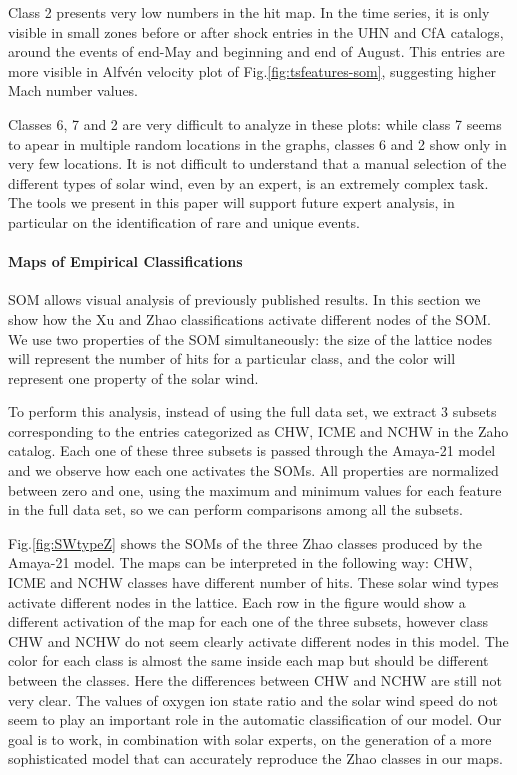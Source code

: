 Class 2 presents very low numbers in the hit map. In the time series, it is only visible in small zones before or after shock entries in the UHN and CfA catalogs, around the events of end-May and beginning and end of August. This entries are more visible in Alfv\'en velocity plot of Fig.\ref{fig:tsfeatures-som}, suggesting higher Mach number values.

Classes 6, 7 and 2 are very difficult to analyze in these plots: while class 7 seems to apear in multiple random locations in the graphs, classes 6 and 2 show only in very few locations. It is not difficult to understand that a manual selection of the different types of solar wind, even by an expert, is an extremely complex task. The tools we present in this paper will support future expert analysis, in particular on the identification of rare and unique events.

\paragraph{Maps of Empirical Classifications}
SOM allows visual analysis of previously published results. In this section we show how the Xu and Zhao classifications activate different nodes of the SOM. We use two properties of the SOM simultaneously: the size of the lattice nodes will represent the number of hits for a particular class, and the color will represent one property of the solar wind.

To perform this analysis, instead of using the full data set, we extract 3 subsets corresponding to the entries categorized as CHW, ICME and NCHW in the Zaho catalog. Each one of these three subsets is passed through the Amaya-21 model and we observe how each one activates the SOMs. All properties are normalized between zero and one, using the maximum and minimum values for each feature in the full data set, so we can perform comparisons among all the subsets.

Fig.\ref{fig:SWtypeZ} shows the SOMs of the three Zhao classes produced by the Amaya-21 model. The maps can be interpreted in the following way: CHW, ICME and NCHW classes have different number of hits. These solar wind types activate different nodes in the lattice. Each row in the figure would show a different activation of the map for each one of the three subsets, however class CHW and NCHW do not seem clearly activate different nodes in this model. The color for each class is almost the same inside each map but should be different between the classes. Here the differences between CHW and NCHW are still not very clear. The values of oxygen ion state ratio and the solar wind speed do not seem to play an important role in the automatic classification of our model. Our goal is to work, in combination with solar experts, on the generation of a more sophisticated model that can accurately reproduce the Zhao classes in our maps.

